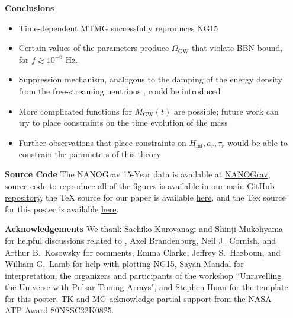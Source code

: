 \documentclass{beamer}                             %
\newcommand{\blocktitle}[1]{{\Large \textbf{#1}}}
\begin{document}
\begin{frame}[t]
\begin{columns}[T]
\begin{column}{0.01\textwidth}
  \begin{center}
    \textcolor{darksilver}{\rule[-1cm]{1mm}{0.8\textheight}}
  \end{center}
\end{column}


\begin{column}{0.30\textwidth}
\begin{tcolorbox}
\blocktitle{Conclusions}
    \begin{itemize}
        \item Time-dependent MTMG successfully reproduces NG15
        \item Certain values of the parameters produce $\Omega_{\text{GW}}$ that violate BBN bound, for $f \gtrsim 10^{-6}$ Hz.
        \item Suppression mechanism, analogous to the damping of the energy density from the free-streaming neutrinos \cite{Durrer:1997ta}, could be introduced
        \item More complicated functions for $M_{\text{GW}}(t)$ are possible; future work can try to place constraints on the time evolution of the mass
        \item Further observations that place constraints on $H_{\text{inf}}, a_r, \tau_r$ would be able to constrain the parameters of this theory
    \end{itemize}
  \end{tcolorbox}

\begin{tcolorbox}
    \blocktitle{Source Code} The NANOGrav 15-Year data is available at \href{https://nanograv.org/science/data}{NANOGrav}, source code to reproduce all of the figures is available in our main \href{https://github.com/ChrisChoi314/constrain_mass_nanograv_15}{GitHub repository}, the TeX source for our paper \cite{Choi:2023tun} is available \href{https://github.com/ChrisChoi314/constraining_NANOGrav_paper}{here}, and the Tex source for this poster is available \href{https://github.com/ChrisChoi314/mg_poster_aas243}{here}. 
    
  \end{tcolorbox}
  
  \begin{tcolorbox}
    \blocktitle{Acknowledgements} We thank Sachiko Kuroyanagi and Shinji Mukohyama for helpful discussions related to \cite{Fujita:2018ehq}, Axel Brandenburg, Neil J.\ Cornish, and Arthur B.\ Kosowsky for comments, Emma Clarke, Jeffrey S.\ Hazboun, and William G.\ Lamb for help with plotting NG15, Sayan Mandal for interpretation, the organizers and participants of the workshop ``Unravelling the Universe with Pulsar Timing Arrays", and Stephen Huan for the template for this poster. TK and MG acknowledge partial support from the NASA ATP Award 80NSSC22K0825.
  \end{tcolorbox}


\end{column}
\end{columns}
\end{frame}
\end{document}
